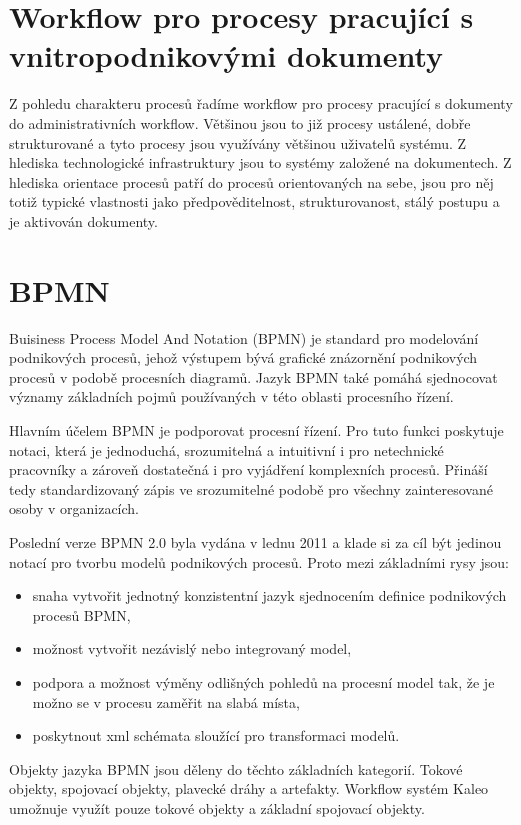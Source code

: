 \documentclass{fithesis}
\begin{document}
\section{Workflow pro procesy pracující s vnitropodnikovými dokumenty}

Z pohledu charakteru procesů řadíme workflow pro procesy pracující s dokumenty do administrativních workflow. Většinou jsou to již procesy ustálené, dobře strukturované a tyto procesy jsou využívány většinou uživatelů systému. Z hlediska technologické infrastruktury jsou to systémy založené na dokumentech. Z hlediska orientace procesů patří do procesů orientovaných na sebe, jsou pro něj totiž typické vlastnosti jako předpověditelnost, strukturovanost, stálý postupu a je aktivován dokumenty.






\section{BPMN}
Buisiness Process Model And Notation (BPMN) je standard pro modelování podnikových procesů, jehož výstupem bývá grafické znázornění podnikových procesů v podobě procesních diagramů. \cite{bpmn} Jazyk BPMN také pomáhá sjednocovat významy základních pojmů používaných v této oblasti procesního řízení. 

Hlavním účelem BPMN je podporovat procesní řízení. Pro tuto funkci poskytuje notaci, která je jednoduchá, srozumitelná a intuitivní i pro netechnické pracovníky a zároveň dostatečná i pro vyjádření komplexních procesů. Přináší tedy standardizovaný zápis ve srozumitelné podobě pro všechny zainteresované osoby v organizacích.

Poslední verze BPMN 2.0 byla vydána v lednu 2011 a klade si za cíl být jedinou notací pro tvorbu modelů podnikových procesů. Proto mezi základními rysy jsou:
\begin{itemize}
\item snaha vytvořit jednotný konzistentní jazyk sjednocením definice podnikových procesů BPMN,
\item možnost vytvořit nezávislý nebo integrovaný model,
\item podpora a možnost výměny odlišných pohledů na procesní model tak, že je možno se v procesu zaměřit na slabá místa,
\item poskytnout xml schémata sloužící pro transformaci modelů.
\end{itemize}

Objekty jazyka BPMN jsou děleny do těchto základních kategorií. Tokové objekty, spojovací objekty, plavecké dráhy a artefakty. \cite{bpmn} Workflow systém Kaleo umožnuje využít pouze tokové objekty a základní spojovací objekty.
\end{document}
